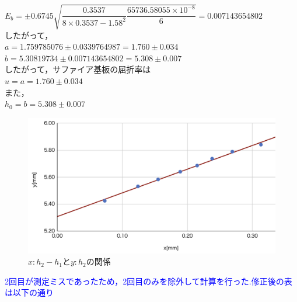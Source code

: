 \documentclass[a4paper,1pt]{jsarticle}
\newcommand{\blue}[1]{\textcolor{blue}{#1}}
\begin{document}
$E_b=\pm0.6745\sqrt{\dfrac{0.3537}{8\times0.3537-1.58^2}\dfrac{65736.58055\times10^{-8}}{6}}=0.007143654802$\\

したがって，\\

$a=1.759785076\pm0.0339764987=1.760\pm0.034$\\

$b=5.30819734\pm0.007143654802=5.308\pm0.007$\\

したがって，サファイア基板の屈折率は\\

$u=a=1.760\pm0.034$\\

また，\\

$h_0=b=5.308\pm0.007$\\


\begin{figure}[h]
  \begin{center}
  \includegraphics[width=150mm]{actB.png}
  \caption{$x:h_2-h_1とy:h_2の関係$}
  \end{center}
\end{figure}

\clearpage

\blue{2回目が測定ミスであったため，2回目のみを除外して計算を行った.修正後の表は以下の通り}\\
\end{document}
